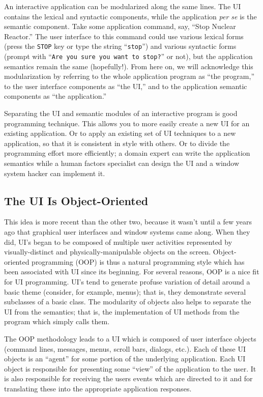 An interactive application can be modularized along the same lines. The UI
contains the lexical and syntactic components, while the application {\em per
se} is the semantic component. Take some application command, say, ``Stop
Nuclear Reactor.'' The user interface to this command could use various lexical
forms (press the {\tt STOP} key or type the string ``{\tt stop}'') and
various syntactic forms (prompt with ``{\tt Are you sure you want to stop?}'' or
not), but the application semantics remain the same (hopefully!). From here on,
we will
acknowledge this modularization by referring to the whole application program as
``the program,'' to the user interface
components as ``the UI,'' and to the application semantic components as ``the
application.''

Separating the UI and semantic modules of an interactive program is good
programming technique. This allows you to more easily create a new UI for an
existing application. Or to apply an existing set of UI techniques to a new
application, so that it is consistent in style with others. Or to divide the
programming effort more efficiently; a domain expert can write the application
semantics while a human factors specialist can design the UI and a window system
hacker can implement it. 

\subsection{The UI Is Object-Oriented} This idea is more recent than the
other two, because it wasn't until a few years ago that graphical user
interfaces and window systems came along.  When they did, UI's began to
be composed of multiple user activities represented by visually-distinct
and physically-manipulable objects on the screen.  Object-oriented
programming (OOP) is thus a natural programming style which has been
associated with UI since its beginning\footnotemark{}.  For several reasons, OOP is a
nice fit for UI programming.  UI's tend to generate profuse variation of
detail around a basic theme (consider, for example, menus); that is,
they demonstrate several subclasses of a basic class.  The modularity
of objects also helps to separate the UI from the semantics; that is,
the implementation of UI methods from the program which simply calls
them.

The OOP methodology leads to a UI which is composed of user interface objects
(command lines, messages, menus, scroll bars, dialogs, etc.). Each of these UI
objects is an ``agent'' for some portion of the  underlying application.
Each UI object is responsible for presenting some ``view'' of the application to
the user. It is also responsible for receiving the users events which are
directed to it and for translating these into the appropriate application
responses. 


